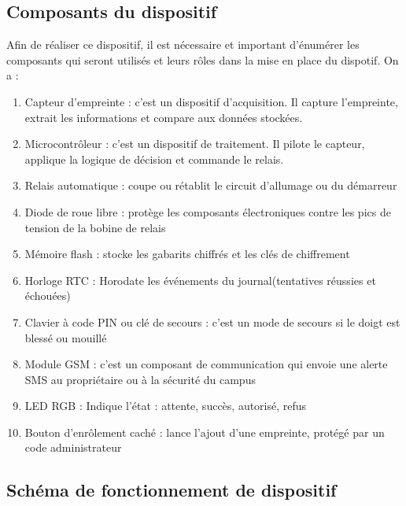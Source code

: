 \documentclass[a4paper,12pt]{article}
\begin{document}
	\subsection{Composants du dispositif}
	Afin de réaliser ce dispositif, il est nécessaire et important d'énumérer les composants qui seront utilisés et leurs rôles dans la mise en place du dispotif. On a :
	\begin{enumerate}
		\item Capteur d'empreinte : c'est un dispositif d'acquisition. Il capture l'empreinte, extrait les informations et compare aux données stockées. 
		
		\item Microcontrôleur : c'est un dispositif de traitement. Il pilote le capteur, applique la logique de décision et commande le relais.
		
		\item Relais automatique : coupe ou rétablit le circuit d'allumage ou du démarreur
		
		\item Diode de roue libre : protège les composants électroniques contre les pics de tension de la bobine de relais
		
		\item Mémoire flash : stocke les gabarits chiffrés et les clés de chiffrement
		
		\item Horloge RTC : Horodate les événements du journal(tentatives réussies et échouées)
		
		\item Clavier à code PIN ou clé de secours : c'est un mode de secours si le doigt est blessé ou mouillé 
		
		\item Module GSM : c'est un composant de communication qui envoie une alerte SMS au propriétaire ou à la sécurité du campus
		
		\item LED RGB : Indique l'état : attente, succès, autorisé, refus
		
		\item Bouton d'enrôlement caché : lance l'ajout d'une empreinte, protégé par un code administrateur
	\end{enumerate}

	\subsection{Schéma de fonctionnement de dispositif}
	
\end{document}
